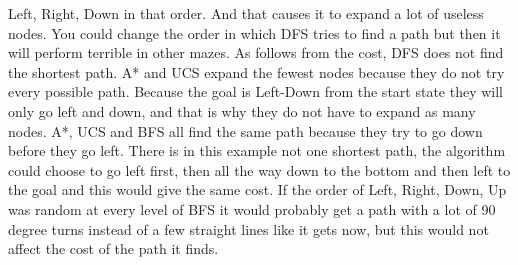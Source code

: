 Left, Right, Down in that order. And that causes it to expand a lot of useless nodes. You could change the order in which DFS 
tries to find a path but then it will perform terrible in other mazes. As follows from the cost, DFS does not find the shortest path.
A* and UCS expand the fewest nodes because they do not try every possible path. Because the goal is Left-Down from the start state
they will only go left and down, and that is why they do not have to expand as many nodes.
A*, UCS and BFS all find the same path because they try to go down before they go left. 
There is in this example not one shortest path, the algorithm could choose to go left first, then all the way down to the bottom
and then left to the goal and this would give the same cost. If the order of Left, Right, Down, Up was random at every level of BFS
it would probably get a path with a lot of 90 degree turns instead of a few straight lines like it gets now, 
but this would not affect the cost of the path it finds.
